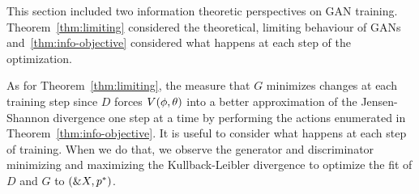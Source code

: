 
This section included two information theoretic perspectives on GAN training.
Theorem~\ref{thm:limiting} considered the theoretical, limiting behaviour of
GANs and~\ref{thm:info-objective} considered what happens at each step of the
optimization.

As for Theorem~\ref{thm:limiting}, the measure that $G$ minimizes changes at
each training step since $D$ forces $V(\phi, \theta)$ into a better approximation of the
Jensen-Shannon divergence one step at a time by performing the actions
enumerated in Theorem~\ref{thm:info-objective}. It is useful to consider what
happens at each step of training. When we do that, we observe the generator and
discriminator minimizing and maximizing the Kullback-Leibler divergence to
optimize the fit of $D$ and $G$ to $(\&X, p^*)$.

